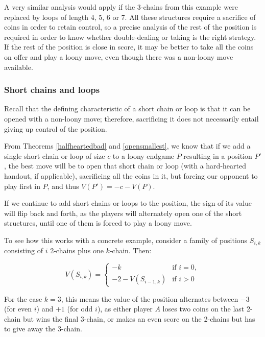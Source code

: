 \documentclass[a4paper,twocolumn]{article}
\begin{document}
A very similar analysis would apply if the 3-chains from this example
were replaced by loops of length 4, 5, 6 or 7. All these structures
require a sacrifice of coins in order to retain control, so a precise
analysis of the rest of the position is required in order to know
whether double-dealing or taking is the right strategy. If the rest of
the position is close in score, it may be better to take all the coins
on offer and play a loony move, even though there was a non-loony move
available.

\subsubsection{Short chains and loops}

Recall that the defining characteristic of a short chain or loop is
that it can be opened with a non-loony move; therefore, sacrificing it
does not necessarily entail giving up control of the position.

From Theorems \ref{halfheartedbad} and \ref{opensmallest}, we know
that if we add a single short chain or loop of size $c$ to a loony
endgame $P$ resulting in a position $P'$, the best move will be to
open that short chain or loop (with a hard-hearted handout, if
applicable), sacrificing all the coins in it, but forcing our opponent
to play first in $P$, and thus $V(P') = -c-V(P)$.

If we continue to add short chains or loops to the position, the sign
of its value will flip back and forth, as the players will alternately
open one of the short structures, until one of them is forced to play
a loony move.

To see how this works with a concrete example, consider a family of
positions $S_{i,k}$ consisting of $i$ 2-chains plus one
$k$-chain. Then:

\begin{equation*}
  V(S_{i,k}) =
  \begin{cases}
    -k & \text{if } i = 0,\\
    -2-V(S_{i-1,k}) & \text{if } i > 0
  \end{cases}
\end{equation*}

For the case $k=3$, this means the value of the position alternates
between $-3$ (for even $i$) and $+1$ (for odd $i$), as either player
$A$ loses two coins on the last 2-chain but wins the final 3-chain, or
makes an even score on the 2-chains but has to give away the 3-chain.
\end{document}
